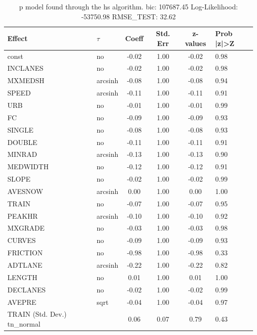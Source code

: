 \begin{table}
	\caption{p model found through the hs algorithm. bic: 107687.45 Log-Likelihood: -53750.98 RMSE_TEST: 32.62}
	\begin{center}
		\begin{tabular}{|l|l|c|c|c|l|}
			\hline
			Effect & $\tau$ & Coeff & Std. Err & z-values & Prob |z|>Z \\
			\hline
			const & no & -0.02 & 1.00 & -0.02 & 0.98 \\
			\hline
			INCLANES & no & -0.02 & 1.00 & -0.02 & 0.98 \\
			\hline
			MXMEDSH & arcsinh & -0.08 & 1.00 & -0.08 & 0.94 \\
			\hline
			SPEED & arcsinh & -0.11 & 1.00 & -0.11 & 0.91 \\
			\hline
			URB & no & -0.01 & 1.00 & -0.01 & 0.99 \\
			\hline
			FC & no & -0.09 & 1.00 & -0.09 & 0.93 \\
			\hline
			SINGLE & no & -0.08 & 1.00 & -0.08 & 0.93 \\
			\hline
			DOUBLE & no & -0.11 & 1.00 & -0.11 & 0.91 \\
			\hline
			MINRAD & arcsinh & -0.13 & 1.00 & -0.13 & 0.90 \\
			\hline
			MEDWIDTH & no & -0.12 & 1.00 & -0.12 & 0.91 \\
			\hline
			SLOPE & no & -0.02 & 1.00 & -0.02 & 0.99 \\
			\hline
			AVESNOW & arcsinh & 0.00 & 1.00 & 0.00 & 1.00 \\
			\hline
			TRAIN & no & -0.07 & 1.00 & -0.07 & 0.95 \\
			\hline
			PEAKHR & arcsinh & -0.10 & 1.00 & -0.10 & 0.92 \\
			\hline
			MXGRADE & no & -0.03 & 1.00 & -0.03 & 0.98 \\
			\hline
			CURVES & no & -0.09 & 1.00 & -0.09 & 0.93 \\
			\hline
			FRICTION & no & -0.98 & 1.00 & -0.98 & 0.33 \\
			\hline
			ADTLANE & arcsinh & -0.22 & 1.00 & -0.22 & 0.82 \\
			\hline
			LENGTH & no & 0.01 & 1.00 & 0.01 & 1.00 \\
			\hline
			DECLANES & no & -0.02 & 1.00 & -0.02 & 0.99 \\
			\hline
			AVEPRE & sqrt & -0.04 & 1.00 & -0.04 & 0.97 \\
			\hline
			TRAIN (Std. Dev.) tn_normal &  & 0.06 & 0.07 & 0.79 & 0.43 \\

\end{tabular}
\end{center}
\end{table}
